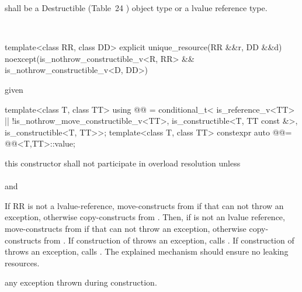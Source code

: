 \documentclass[ebook,11pt,article]{memoir}
\begin{document}
\pnum
{} shall be a
Destructible 
(Table~24
) object type 
or a lvalue reference type.

\pnum
\requires
{}\\



\begin{itemdecl}
    template<class RR, class DD>
    explicit unique_resource(RR &&r, DD &&d)
        noexcept(is_nothrow_constructible_v<R, RR> 
                && is_nothrow_constructible_v<D, DD>)
\end{itemdecl}

\begin{itemdescr}
\pnum
\remarks
given 
\begin{codeblock}
template<class T, class TT>
using @@ =
     conditional_t<
        is_reference_v<TT> || !is_nothrow_move_constructible_v<TT>,
        is_constructible<T, TT const &>,
        is_constructible<T, TT>>;
template<class T, class TT>
constexpr auto @@=
		@@<T,TT>::value;
\end{codeblock}
this constructor shall not participate in overload resolution unless
\\ \\
and\\

\pnum
\effects If RR is not a lvalue-reference, move-constructs  from  if that can not throw an exception, otherwise copy-constructs  from . Then, if  is not an lvalue reference, move-constructs  from  if that can not throw an exception, otherwise copy-constructs  from . If construction of  throws an exception, calls .  If construction of  throws an exception, calls . 
\enternote
The explained mechanism should ensure no leaking resources.
\exitnote

\pnum
\throws any exception thrown during construction.
\end{itemdescr}
\end{document}
